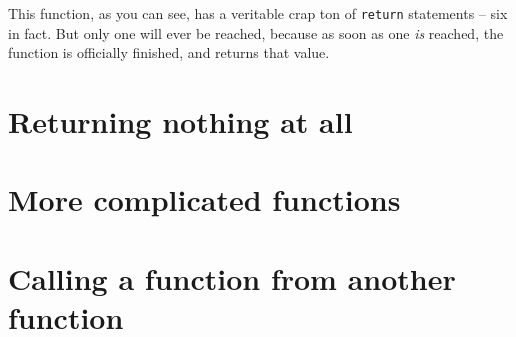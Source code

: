 This function, as you can see, has a veritable crap ton of \texttt{return}
statements -- six in fact. But only one will ever be reached, because as soon
as one \textit{is} reached, the function is officially finished, and returns
that value.

\section{Returning nothing at all}

\section{More complicated functions}

\section{Calling a function from another function}


